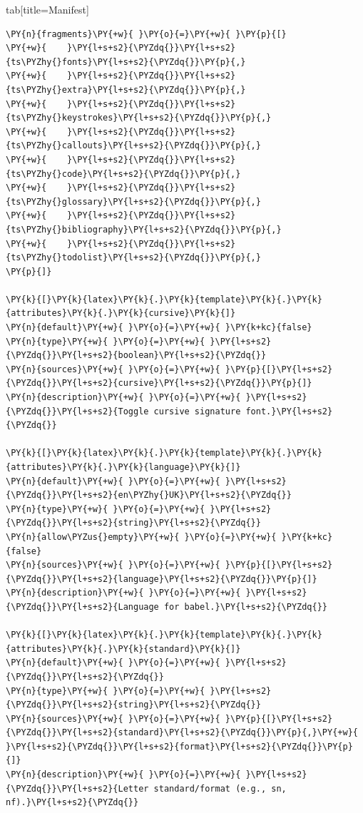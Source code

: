\documentclass[a4paper,twoside]{article}
\begin{document}
\begin{tsdiv}{tab}[title=Manifest]
\begin{tscode}[lang=toml, engine=pygments]
\begin{Verbatim}[commandchars=\\\{\},breaklines, breakanywhere, commandchars=\\\{\}]
\PY{n}{fragments}\PY{+w}{ }\PY{o}{=}\PY{+w}{ }\PY{p}{[}
\PY{+w}{    }\PY{l+s+s2}{\PYZdq{}}\PY{l+s+s2}{ts\PYZhy{}fonts}\PY{l+s+s2}{\PYZdq{}}\PY{p}{,}
\PY{+w}{    }\PY{l+s+s2}{\PYZdq{}}\PY{l+s+s2}{ts\PYZhy{}extra}\PY{l+s+s2}{\PYZdq{}}\PY{p}{,}
\PY{+w}{    }\PY{l+s+s2}{\PYZdq{}}\PY{l+s+s2}{ts\PYZhy{}keystrokes}\PY{l+s+s2}{\PYZdq{}}\PY{p}{,}
\PY{+w}{    }\PY{l+s+s2}{\PYZdq{}}\PY{l+s+s2}{ts\PYZhy{}callouts}\PY{l+s+s2}{\PYZdq{}}\PY{p}{,}
\PY{+w}{    }\PY{l+s+s2}{\PYZdq{}}\PY{l+s+s2}{ts\PYZhy{}code}\PY{l+s+s2}{\PYZdq{}}\PY{p}{,}
\PY{+w}{    }\PY{l+s+s2}{\PYZdq{}}\PY{l+s+s2}{ts\PYZhy{}glossary}\PY{l+s+s2}{\PYZdq{}}\PY{p}{,}
\PY{+w}{    }\PY{l+s+s2}{\PYZdq{}}\PY{l+s+s2}{ts\PYZhy{}bibliography}\PY{l+s+s2}{\PYZdq{}}\PY{p}{,}
\PY{+w}{    }\PY{l+s+s2}{\PYZdq{}}\PY{l+s+s2}{ts\PYZhy{}todolist}\PY{l+s+s2}{\PYZdq{}}\PY{p}{,}
\PY{p}{]}

\PY{k}{[}\PY{k}{latex}\PY{k}{.}\PY{k}{template}\PY{k}{.}\PY{k}{attributes}\PY{k}{.}\PY{k}{cursive}\PY{k}{]}
\PY{n}{default}\PY{+w}{ }\PY{o}{=}\PY{+w}{ }\PY{k+kc}{false}
\PY{n}{type}\PY{+w}{ }\PY{o}{=}\PY{+w}{ }\PY{l+s+s2}{\PYZdq{}}\PY{l+s+s2}{boolean}\PY{l+s+s2}{\PYZdq{}}
\PY{n}{sources}\PY{+w}{ }\PY{o}{=}\PY{+w}{ }\PY{p}{[}\PY{l+s+s2}{\PYZdq{}}\PY{l+s+s2}{cursive}\PY{l+s+s2}{\PYZdq{}}\PY{p}{]}
\PY{n}{description}\PY{+w}{ }\PY{o}{=}\PY{+w}{ }\PY{l+s+s2}{\PYZdq{}}\PY{l+s+s2}{Toggle cursive signature font.}\PY{l+s+s2}{\PYZdq{}}

\PY{k}{[}\PY{k}{latex}\PY{k}{.}\PY{k}{template}\PY{k}{.}\PY{k}{attributes}\PY{k}{.}\PY{k}{language}\PY{k}{]}
\PY{n}{default}\PY{+w}{ }\PY{o}{=}\PY{+w}{ }\PY{l+s+s2}{\PYZdq{}}\PY{l+s+s2}{en\PYZhy{}UK}\PY{l+s+s2}{\PYZdq{}}
\PY{n}{type}\PY{+w}{ }\PY{o}{=}\PY{+w}{ }\PY{l+s+s2}{\PYZdq{}}\PY{l+s+s2}{string}\PY{l+s+s2}{\PYZdq{}}
\PY{n}{allow\PYZus{}empty}\PY{+w}{ }\PY{o}{=}\PY{+w}{ }\PY{k+kc}{false}
\PY{n}{sources}\PY{+w}{ }\PY{o}{=}\PY{+w}{ }\PY{p}{[}\PY{l+s+s2}{\PYZdq{}}\PY{l+s+s2}{language}\PY{l+s+s2}{\PYZdq{}}\PY{p}{]}
\PY{n}{description}\PY{+w}{ }\PY{o}{=}\PY{+w}{ }\PY{l+s+s2}{\PYZdq{}}\PY{l+s+s2}{Language for babel.}\PY{l+s+s2}{\PYZdq{}}

\PY{k}{[}\PY{k}{latex}\PY{k}{.}\PY{k}{template}\PY{k}{.}\PY{k}{attributes}\PY{k}{.}\PY{k}{standard}\PY{k}{]}
\PY{n}{default}\PY{+w}{ }\PY{o}{=}\PY{+w}{ }\PY{l+s+s2}{\PYZdq{}}\PY{l+s+s2}{\PYZdq{}}
\PY{n}{type}\PY{+w}{ }\PY{o}{=}\PY{+w}{ }\PY{l+s+s2}{\PYZdq{}}\PY{l+s+s2}{string}\PY{l+s+s2}{\PYZdq{}}
\PY{n}{sources}\PY{+w}{ }\PY{o}{=}\PY{+w}{ }\PY{p}{[}\PY{l+s+s2}{\PYZdq{}}\PY{l+s+s2}{standard}\PY{l+s+s2}{\PYZdq{}}\PY{p}{,}\PY{+w}{ }\PY{l+s+s2}{\PYZdq{}}\PY{l+s+s2}{format}\PY{l+s+s2}{\PYZdq{}}\PY{p}{]}
\PY{n}{description}\PY{+w}{ }\PY{o}{=}\PY{+w}{ }\PY{l+s+s2}{\PYZdq{}}\PY{l+s+s2}{Letter standard/format (e.g., sn, nf).}\PY{l+s+s2}{\PYZdq{}}


\end{Verbatim}
\end{tscode}
\end{tsdiv}
\end{document}
